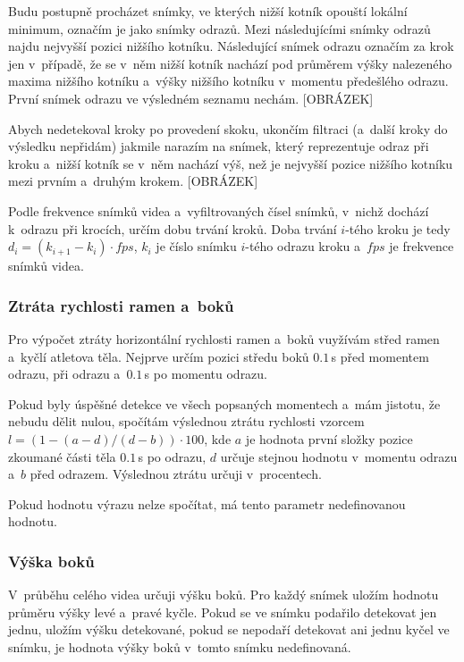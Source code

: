 Budu postupně procházet snímky, ve kterých nižší kotník opouští lokální minimum, označím je jako snímky odrazů. Mezi následujícími snímky odrazů najdu nejvyšší pozici nižšího kotníku. Následující snímek odrazu označím za krok jen v~případě, že se v~něm nižší kotník nachází pod průměrem výšky nalezeného maxima nižšího kotníku a~výšky nižšího kotníku v~momentu předešlého odrazu. První snímek odrazu ve výsledném seznamu nechám. [OBRÁZEK]

Abych nedetekoval kroky po provedení skoku, ukončím filtraci (a~další kroky do výsledku nepřidám) jakmile narazím na snímek, který reprezentuje odraz při kroku a~nižší kotník se v~něm nachází výš, než je nejvyšší pozice nižšího kotníku mezi prvním a~druhým krokem. [OBRÁZEK]

Podle frekvence snímků videa a~vyfiltrovaných čísel snímků, v~nichž dochází k~odrazu při krocích, určím dobu trvání kroků. Doba trvání $i$-tého kroku je tedy $d_i=(k_{i+1}-k_i)\cdot fps$, $k_i$ je číslo snímku $i$-tého odrazu kroku a~$fps$ je frekvence snímků videa.


\subsubsection{Ztráta rychlosti ramen a~boků}

Pro výpočet ztráty horizontální rychlosti ramen a~boků vuyžívám střed ramen a~kyčlí atletova těla. Nejprve určím pozici středu boků $0.1$\,\rm s před momentem odrazu, při odrazu a~$0.1$\,\rm s po momentu odrazu.

Pokud byly úspěšné detekce ve všech popsaných momentech a~mám jistotu, že nebudu dělit nulou, spočítám výslednou ztrátu rychlosti vzorcem $l=(1-(a-d)/(d-b))\cdot100$, kde $a$ je hodnota první složky pozice zkoumané části těla $0.1$\,\rm s po odrazu, $d$ určuje stejnou hodnotu v~momentu odrazu a~$b$ před odrazem. Výslednou ztrátu určuji v~procentech.

Pokud hodnotu výrazu nelze spočítat, má tento parametr nedefinovanou hodnotu.


\subsubsection{Výška boků}

V~průběhu celého videa určuji výšku boků. Pro každý snímek uložím hodnotu průměru výšky levé a~pravé kyčle. Pokud se ve snímku podařilo detekovat jen jednu, uložím výšku detekované, pokud se nepodaří detekovat ani jednu kyčel ve snímku, je hodnota výšky boků v~tomto snímku nedefinovaná.


